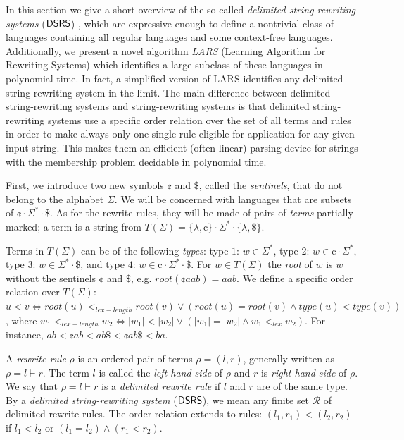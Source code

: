 In this section we give a short overview of the so-called \emph{delimited string-rewriting systems} ($\textup{\sf DSRS}$) \cite{Eyraud2007}, which are expressive enough to define a nontrivial class of languages containing all regular languages and some context-free languages. Additionally, we present a novel algorithm \emph{LARS} \cite{Eyraud2007} (Learning Algorithm for Rewriting Systems) which identifies a large subclass of these languages in polynomial time. In fact, a simplified version of LARS \cite{delaHiguera2010} identifies any delimited string-rewriting system in the limit. The main difference between delimited string-rewriting systems and string-rewriting systems is that delimited string-rewriting systems use a specific order relation over the set of all terms and rules in order to make always only one single rule eligible for application for any given input string. This makes them an efficient (often linear) parsing device for strings with the membership problem decidable in polynomial time.

First, we introduce two new symbols $\cent$ and $\$$, called the \emph{sentinels}, that do not belong to the alphabet $\Sigma$. We will be concerned with languages that are subsets of $\cent \cdot \Sigma^* \cdot \$$. As for the rewrite rules, they will be made of pairs of \emph{terms} partially marked; a term is a string from $T(\Sigma) = \{\lambda, \cent\} \cdot \Sigma^* \cdot \{\lambda, \$\}$.

Terms in $T(\Sigma)$ can be of the following \emph{types}: type $1$: $w \in \Sigma^*$, type $2$: $w \in \cent \cdot \Sigma^*$, type $3$: $w \in \Sigma^* \cdot \$$, and type $4$: $w \in \cent \cdot \Sigma^* \cdot \$$. For $w \in T(\Sigma)$ the \emph{root} of $w$ is $w$ without the sentinels $\cent$ and $\$$, e.g. $root(\cent aab) = aab$. We define a specific order relation over $T(\Sigma)$: $u < v \Leftrightarrow root(u) <_{lex-length} root(v) \vee (root(u) = root(v) \wedge type(u) < type(v))$, where $w_1 <_{lex-length} w_2 \Leftrightarrow |w_1| < |w_2| \vee (|w_1| = |w_2| \wedge w_1 <_{lex} w_2)$. For instance, $ab < \cent ab < ab \$ < \cent ab \$ < ba$.

A \emph{rewrite rule} $\rho$ is an ordered pair of terms $\rho = (l, r)$, generally written as $\rho = l \vdash r$. The term $l$ is called the \emph{left-hand side} of $\rho$ and $r$ is \emph{right-hand side} of $\rho$. We say that $\rho = l \vdash r$ is a \emph{delimited rewrite rule} if $l$ and $r$ are of the same type. By a \emph{delimited string-rewriting system} ($\textup{\sf DSRS}$), we mean any finite set $\mathcal{R}$ of delimited rewrite rules. The order relation extends to rules: $(l_1, r_1) < (l_2, r_2)$ if $l_1 < l_2$ or $(l_1 = l_2) \wedge (r_1 < r_2)$.

